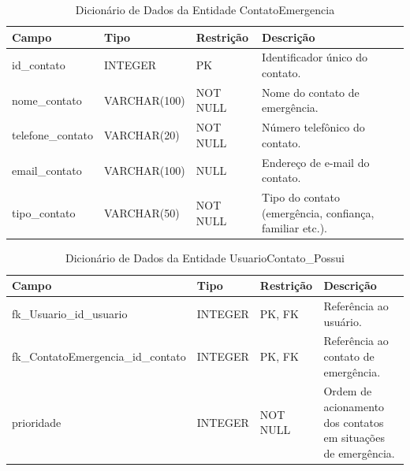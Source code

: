 \begin{table}[H]
\caption{Dicionário de Dados da Entidade ContatoEmergencia}
\label{quad_contato}
\centering
\footnotesize

\begin{tabular}{|p{3cm}|p{2.5cm}|p{4cm}|p{5cm}|}
\hline
\textbf{Campo} & \textbf{Tipo} & \textbf{Restrição} & \textbf{Descrição} \\
\hline

id\_contato & INTEGER & PK & Identificador único do contato. \\
\hline

nome\_contato & VARCHAR(100) & NOT NULL & Nome do contato de emergência. \\
\hline

telefone\_contato & VARCHAR(20) & NOT NULL & Número telefônico do contato. \\
\hline

email\_contato & VARCHAR(100) & NULL & Endereço de e-mail do contato. \\
\hline

tipo\_contato & VARCHAR(50) & NOT NULL & Tipo do contato (emergência, confiança, familiar etc.). \\
\hline

\end{tabular}

\normalsize

\end{table}

\begin{table}[H]
\caption{Dicionário de Dados da Entidade UsuarioContato\_Possui}
\label{quad_usuario_contato}
\centering
\footnotesize

\begin{tabular}{|p{}|p{2cm}|p{2.5cm}|p{}|}
\hline
\textbf{Campo} & \textbf{Tipo} & \textbf{Restrição} & \textbf{Descrição} \\
\hline

fk\_Usuario\_id\_usuario & INTEGER & PK, FK & Referência ao usuário. \\
\hline

fk\_ContatoEmergencia\_id\_contato & INTEGER & PK, FK & Referência ao contato de emergência. \\
\hline

prioridade & INTEGER & NOT NULL & Ordem de acionamento dos contatos em situações de emergência. \\
\hline

\end{tabular}

\normalsize

\end{table}

